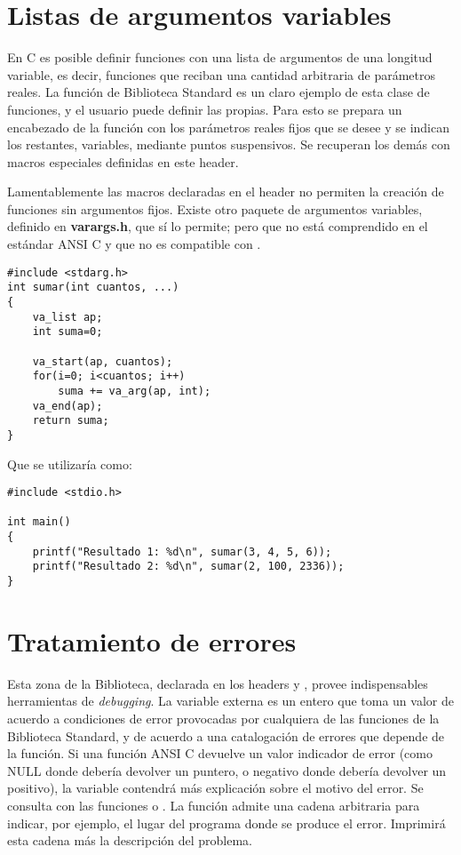\section{Listas de argumentos variables}
En C es posible definir funciones con una lista de argumentos de una longitud variable, es decir, 
funciones que reciban una cantidad arbitraria de parámetros reales. La función de Biblioteca 
Standard  es un claro ejemplo de esta clase de funciones, y el usuario puede definir las propias.
Para esto se prepara un encabezado de la función con los parámetros
reales fijos que se desee y se indican los restantes, variables, mediante
puntos suspensivos. Se recuperan los demás con macros especiales definidas en
este header.

Lamentablemente las macros declaradas en el header  no permiten la creación de funciones sin
argumentos fijos. Existe otro paquete de argumentos variables, definido en
\textbf{varargs.h}, que sí lo permite; pero que no está comprendido en el estándar ANSI
C y que no es compatible con .

\begin{ejemplo}
\begin{lstlisting}
#include <stdarg.h>
int sumar(int cuantos, ...)
{
	va_list ap;
	int suma=0;

	va_start(ap, cuantos);
	for(i=0; i<cuantos; i++)
		suma += va_arg(ap, int);
	va_end(ap);
	return suma;
}
\end{lstlisting}
Que se utilizaría como:
\begin{lstlisting}
#include <stdio.h>

int main()
{
	printf("Resultado 1: %d\n", sumar(3, 4, 5, 6));
	printf("Resultado 2: %d\n", sumar(2, 100, 2336));
}
\end{lstlisting}
\end{ejemplo}

\section{Tratamiento de errores}
Esta zona de la Biblioteca, declarada en los headers  y , provee indispensables herramientas de \textit{debugging}. La
variable externa  es un entero que toma un valor de acuerdo a condiciones
de error provocadas por cualquiera de las funciones de la Biblioteca Standard, y de acuerdo a
una catalogación de errores que depende de la función. Si una función ANSI C
devuelve un valor indicador de error (como NULL donde debería devolver un
puntero, o negativo donde debería devolver un positivo), la variable 
contendrá más explicación sobre el motivo del error. Se consulta con las
funciones  o . La función  admite una cadena
arbitraria para indicar, por ejemplo, el lugar del programa donde se produce el
error. Imprimirá esta cadena más la descripción del problema.

